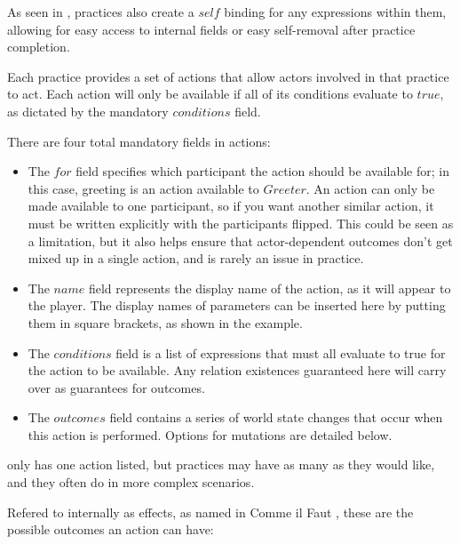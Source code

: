 As seen in , practices also create a $self$ binding for any
expressions within them, allowing for easy access to internal fields or easy self-removal
after practice completion.

Each practice provides a set of actions that allow actors involved in that practice
to act. Each action will only be available if all of its conditions evaluate to $true$,
as dictated by the mandatory $conditions$ field.

There are four total mandatory fields in actions:

\begin{itemize}
    \item The $for$ field specifies which participant the action should be available
    for; in this case, greeting is an action available to $Greeter$. An action can
    only be made available to one participant, so if you want another similar action,
    it must be written explicitly with the participants flipped. This could be seen
    as a limitation, but it also helps ensure that actor-dependent outcomes don't get
    mixed up in a single action, and is rarely an issue in practice.
    \item The $name$ field represents the display name of the action, as it will
    appear to the player. The display names of parameters can be inserted here by
    putting them in square brackets, as shown in the example.
    \item The $conditions$ field is a list of expressions that must all evaluate to
    true for the action to be available. Any relation existences guaranteed here will
    carry over as guarantees for outcomes.
    \item The $outcomes$ field contains a series of world state changes that occur when
    this action is performed. Options for mutations are detailed below.
\end{itemize}

 only has one action listed, but practices may have as many as
they would like, and they often do in more complex scenarios.

Refered to internally as effects, as named in Comme il Faut \cite{mccoy_comme_2011},
these are the possible outcomes an action can have:

